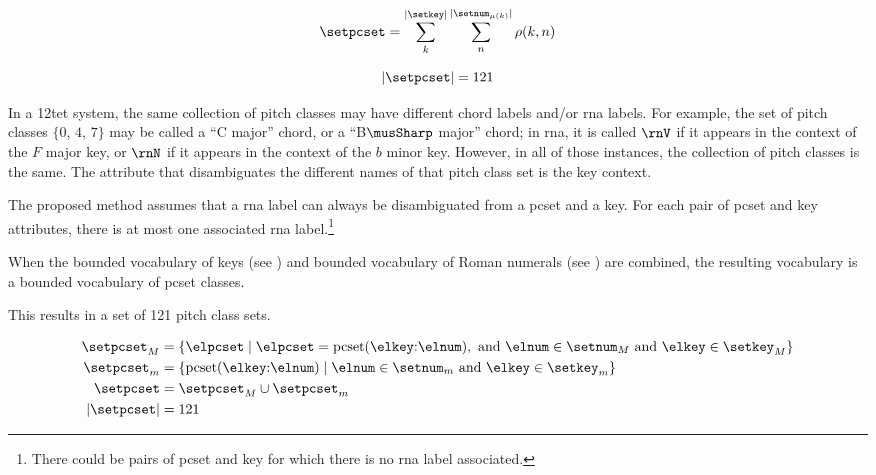 
\begin{equation}
    \setpcset = \sum_{k}^{| \setkey |} \sum_{n}^{| \setnum_{\mu(k)} |} \rho(k, n)
\end{equation}

\begin{equation}
    | \setpcset | = 121
\end{equation}

In a \gls{12tet} system, the same collection of pitch
classes may have different chord labels and/or \gls{rna}
labels. For example, the set of pitch classes $\{0$, $4$,
$7\}$ may be called a ``C major'' chord, or a ``B$\musSharp$
major'' chord; in \gls{rna}, it is called $\rnV$ if it
appears in the context of the $F$ major key, or $\rnN$ if it
appears in the context of the $b$ minor key. However, in all
of those instances, the collection of pitch classes is the
same. The attribute that disambiguates the different names
of that pitch class set is the key context.

The proposed method assumes that a \gls{rna} label can
always be disambiguated from a \gls{pcset} and a key. For
each pair of \gls{pcset} and key attributes, there is at
most one associated \gls{rna} label.\footnote{There could be
pairs of \gls{pcset} and key for which there is no \gls{rna}
label associated.}

When the bounded vocabulary of keys (see
) and bounded vocabulary
of Roman numerals (see
) are combined, the
resulting vocabulary is a bounded vocabulary of \gls{pcset}
classes.

This results in a set of 121 pitch class sets.

\begin{equation}
    \begin{split}
    \setpcset_M &= \{ \elpcset \mid \elpcset = \text{pcset}(\elkey\text{:}\elnum), \text{ and }
    \elnum \in \setnum_M \text{ and } \elkey \in \setkey_M \} \\
    \setpcset_m &= \{ \text{pcset}(\elkey\text{:}\elnum) \mid 
    \elnum \in \setnum_m \text{ and } \elkey \in \setkey_m \} \\ 
    \setpcset &= \setpcset_M \cup \setpcset_m \\
    | \setpcset | &= 121 \\    
    \end{split}
\end{equation}
